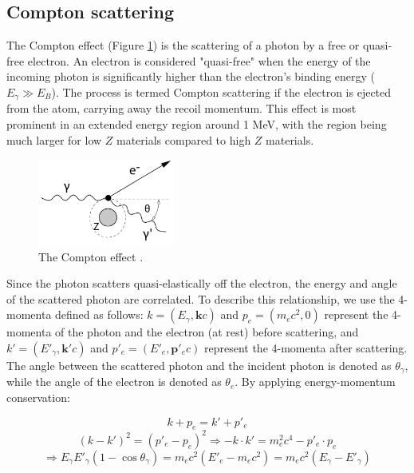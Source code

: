 \subsection{Compton scattering}
The Compton effect (Figure \ref{fig:compt}) is the 
scattering of a photon by a free or quasi-free electron. 
An electron is considered "quasi-free" when the energy of 
the incoming photon is significantly higher than the 
electron's binding energy ($E_\gamma \gg E_B$). The 
process is termed Compton scattering if the 
electron is ejected from the atom, carrying away the 
recoil momentum. This effect is most prominent in an 
extended energy region around 1 MeV, with the region 
being much larger for low $Z$ materials compared to high $Z$ materials.

\begin{figure}[!h]
    \centering
    \includegraphics[width =0.4\textwidth]{figures/png/Screenshot_20240812_204345.png}
    \caption[The Compton effect.]{
    The Compton effect \cite{kola}.}
    \label{fig:compt}
\end{figure}

Since the photon scatters quasi-elastically off the electron, 
the energy and angle of the scattered photon are correlated. 
To describe this relationship, we use the 4-momenta defined as 
follows: $k = (E_\gamma, \mathbf{k}c)$ and $p_e = (m_e c^2, 0)$ 
represent the 4-momenta of the photon and the electron (at rest) 
before scattering, and $k' = (E'_\gamma, \mathbf{k}'c)$ and 
$p'_e = (E'_e, \mathbf{p}'_e c)$ represent the 4-momenta 
after scattering. The angle between the scattered photon and 
the incident photon is denoted as $\theta_\gamma$, while the 
angle of the electron is denoted as $\theta_e$. By applying 
energy-momentum conservation:

\begin{equation}\label{compcons}
k + p_e = k' + p'_e
\end{equation}
\begin{equation}\label{compcons2}
(k - k')^2 = (p'_e - p_e)^2 \Rightarrow -k \cdot k' = m_e^2 c^4 - p'_e \cdot p_e
\end{equation}
\begin{equation}
\Rightarrow E_\gamma E'_\gamma (1 - \cos \theta_\gamma) = m_e c^2 \left(E'_e - m_e c^2\right) = m_e c^2 \left(E_\gamma - E'_\gamma \right)
\end{equation}

